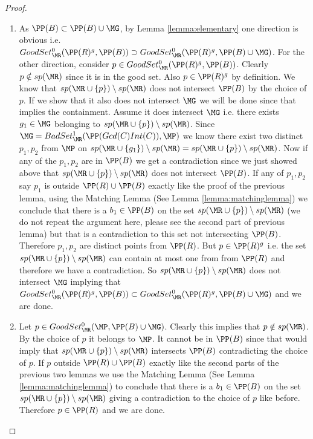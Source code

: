 \begin{proof}
 \begin{enumerate}
  \item As $\PP(B) \subset \PP(B)\cup\MG$, by Lemma \ref{lemma:elementary} one direction is obvious i.e.
  $GoodSet^0_\MR(\PP(R)^g, \PP(B)) \supset GoodSet^0_\MR(\PP(R)^g,\PP(B)\cup \MG)$. For the other direction,
  consider $p\in GoodSet^0_\MR(\PP(R)^g, \PP(B))$. Clearly $p\notin sp(\MR)$ since it is in the good set. Also
  $p\in \PP(R)^g$ by definition. We know that $sp(\MR\cup \{p\})\setminus sp(\MR)$ does not intersect $\PP(B)$ by the
  choice of $p$. If we show that it also does not intersect $\MG$ we will be done since that implies the containment.
  Assume it does intersect $\MG$ i.e. there exists $g_1\in \MG$ belonging to $sp(\MR\cup\{p\})\setminus sp(\MR)$. 
  Since $\MG = BadSet^1_{\MR}(\PP(Gcd(C)Int(C)), \MP)$ we know there exist two distinct $p_1,p_2$ from $\MP$ on
  $sp(\MR\cup\{g_1\})\setminus sp(\MR) = sp(\MR\cup\{p\})\setminus sp(\MR)$. Now if any of the $p_1,p_2$ are in $\PP(B)$
  we get a contradiction since we just showed above that $sp(\MR\cup\{p\})\setminus sp(\MR)$ does not intersect $\PP(B)$. 
  If any of $p_1,p_2$ say $p_1$ is outside $\PP(R)\cup \PP(B)$ exactly like the proof of the previous lemma, using the Matching
  Lemma (See Lemma \ref{lemma:matchinglemma}) we conclude that there is a $b_1\in \PP(B)$ on the set $sp(\MR\cup \{p\})\setminus
  sp(\MR)$ (we do not repeat the argument here, please see the second part of previous lemma) but that is a contradiction
  to this set not intersecting $\PP(B)$. Therefore $p_1,p_2$ are distinct points from $\PP(R)$. But $p\in \PP(R)^g$ i.e. 
  the set $sp(\MR\cup\{p\})\setminus sp(\MR)$ can contain at most one from from $\PP(R)$ and therefore we have a contradiction.
  So $sp(\MR\cup\{p\})\setminus sp(\MR)$ does not intersect $\MG$ 
  implying that $GoodSet^0_\MR(\PP(R)^g, \PP(B)) \subset GoodSet^0_\MR(\PP(R)^g,\PP(B)\cup \MG)$ and we are done.
  
  \item Let $p\in GoodSet^0_\MR(\MP,\PP(B)\cup \MG)$. Clearly this implies that $p\notin sp(\MR)$. By the choice of $p$
  it belongs to $\MP$. It cannot be in $\PP(B)$ since that would imply that $sp(\MR\cup\{p\})\setminus sp(\MR)$
  intersects $\PP(B)$ contradicting the choice of $p$. If $p$ outside $\PP(R)\cup \PP(B)$ exactly like the second parts
  of the previous two lemmas we use the Matching Lemma (See Lemma \ref{lemma:matchinglemma}) to conclude that there is a $b_1\in \PP(B)$
  on the set $sp(\MR\cup\{p\})\setminus sp(\MR)$ giving a contradiction to the choice of $p$ like before. Therefore $p\in \PP(R)$
  and we are done.
  
 \end{enumerate}

\end{proof}




